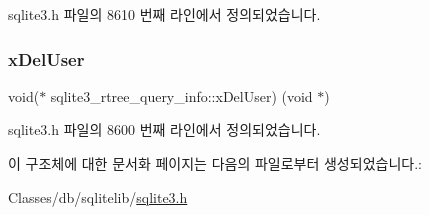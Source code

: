 sqlite3.\+h 파일의 8610 번째 라인에서 정의되었습니다.

\mbox{\label{structsqlite3__rtree__query__info_a23bcc6df883995d42d65449a27f45f85}} 
\subsubsection{\texorpdfstring{x\+Del\+User}{xDelUser}}
{\footnotesize\ttfamily void($\ast$ sqlite3\+\_\+rtree\+\_\+query\+\_\+info\+::x\+Del\+User) (void $\ast$)}



sqlite3.\+h 파일의 8600 번째 라인에서 정의되었습니다.



이 구조체에 대한 문서화 페이지는 다음의 파일로부터 생성되었습니다.\+:\begin{DoxyCompactItemize}
\item 
Classes/db/sqlitelib/\hyperlink{sqlite3_8h}{sqlite3.\+h}\end{DoxyCompactItemize}
